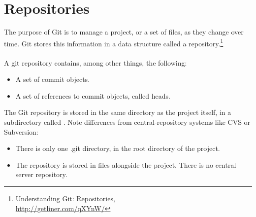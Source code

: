 
\newpage
\section{Repositories}
The purpose of Git is to manage a project, or a set of files, as
they change over time.  Git stores this information in a data
structure called a repository.\footnote{Understanding Git: Repositories,\\
\href{http://getliner.com/qXYnW/}{http://getliner.com/qXYnW/}}
\\
\\
A git repository contains, among other things, the following:

\begin{itemize}
  \item{A set of commit objects.}
  \item{A set of references to commit objects, called heads.}
\end{itemize}

\noindent The Git repository is stored in the same directory as
the project itself, in a subdirectory called .  Note
differences from central-repository systems like CVS or
Subversion:

\begin{itemize}
  \item{There is only one .git directory,
        in the root directory of the project.}
  \item{The repository is stored in files alongside the project.
        There is no central server repository.}
\end{itemize}







